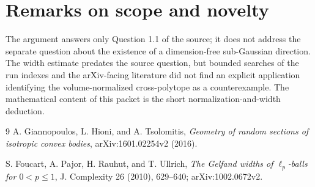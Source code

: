 \documentclass[11pt]{article}
\begin{document}
\section{Remarks on scope and novelty}

The argument answers only Question 1.1 of the source; it does not
address the separate question about the existence of a dimension-free
sub-Gaussian direction.  The width estimate predates the source
question, but bounded searches of the run indexes and the arXiv-facing
literature did not find an explicit application identifying the
volume-normalized cross-polytope as a counterexample.  The mathematical
content of this packet is the short normalization-and-width deduction.

\begin{thebibliography}{9}
A. Giannopoulos, L. Hioni, and A. Tsolomitis,
\emph{Geometry of random sections of isotropic convex bodies},
arXiv:1601.02254v2 (2016).

S. Foucart, A. Pajor, H. Rauhut, and T. Ullrich,
\emph{The Gelfand widths of $\ell_p$-balls for $0<p\le1$},
J. Complexity 26 (2010), 629--640; arXiv:1002.0672v2.
\end{thebibliography}
\end{document}
